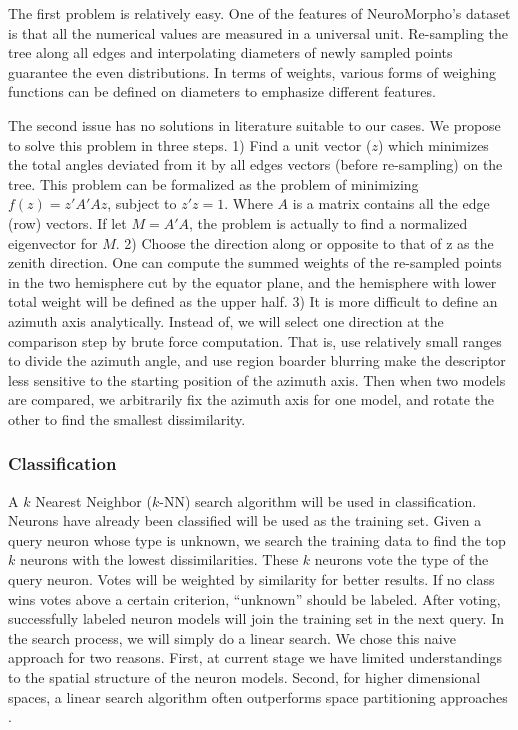 \documentclass[letterpaper,11pt,oneside]{article}
\begin{document}
The first problem is relatively easy. One of the features of NeuroMorpho's dataset is that all the numerical values are measured in a universal unit. Re-sampling the tree along all edges and interpolating diameters of newly sampled points guarantee the even distributions. In terms of weights, various forms of weighing functions can be defined on diameters to emphasize different features.

The second issue has no solutions in literature suitable to our cases. We propose to solve this problem in three steps. 1) Find a unit vector ($z$) which minimizes the total angles deviated from it by all edges vectors (before re-sampling) on the tree. This problem can be formalized as the problem of minimizing $f(z) = z'A'Az$,  subject to $z'z  = 1$. Where $A$ is a matrix contains all the edge (row) vectors. If let $M = A'A$, the problem is actually to find a normalized eigenvector for $M$. 2) Choose the direction along or opposite to that of z as the zenith direction. One can compute the summed weights of the re-sampled points in the two hemisphere cut by the equator plane, and the hemisphere with lower total weight will be defined as the upper half. 3) It is more difficult to define an azimuth axis analytically. Instead of, we will select one direction at the comparison step by brute force computation. That is, use relatively small ranges to divide the azimuth angle, and use region boarder blurring make the descriptor less sensitive to the starting position of the azimuth axis. Then when two models are compared, we arbitrarily fix the azimuth axis for one model, and rotate the other to find the smallest dissimilarity.

\subsubsection{Classification}
A $k$ Nearest Neighbor ($k$-NN) search algorithm will be used in classification. Neurons have already been classified will be used as the training set. Given a query neuron whose type is unknown, we search the training data to find the top $k$ neurons with the lowest dissimilarities. These $k$ neurons vote the type of the query neuron. Votes will be weighted by similarity for better results. If no class wins votes above a certain criterion, ``unknown'' should be labeled. After voting, successfully labeled neuron models will join the training set in the next query. In the search process, we will simply do a linear search. We chose this naive approach for two reasons. First, at current stage we have limited understandings to the spatial structure of the neuron models. Second, for higher dimensional spaces, a linear search algorithm often outperforms space partitioning approaches \cite{Weber98}. 
\end{document}
